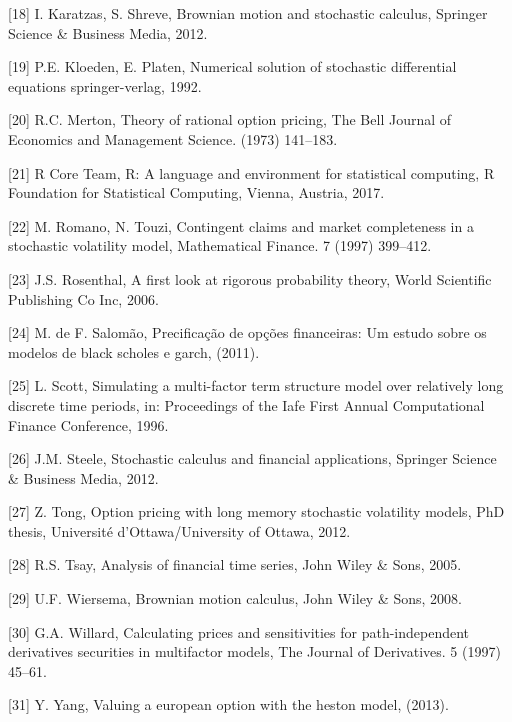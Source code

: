 \documentclass[12pt,twoside]{reedthesis}
\theoremstyle{definition}
\theoremstyle{definition}
\theoremstyle{remark}
\begin{document}
  \hypertarget{ref-karatzas2012brownian}{}
  {[}18{]} I. Karatzas, S. Shreve, Brownian motion and stochastic
  calculus, Springer Science \& Business Media, 2012.
  
  \hypertarget{ref-kloeden1992}{}
  {[}19{]} P.E. Kloeden, E. Platen, Numerical solution of stochastic
  differential equations springer-verlag, 1992.
  
  \hypertarget{ref-merton1973theory}{}
  {[}20{]} R.C. Merton, Theory of rational option pricing, The Bell
  Journal of Economics and Management Science. (1973) 141--183.
  
  \hypertarget{ref-rlang}{}
  {[}21{]} R Core Team, R: A language and environment for statistical
  computing, R Foundation for Statistical Computing, Vienna, Austria,
  2017.
  
  \hypertarget{ref-romano1997}{}
  {[}22{]} M. Romano, N. Touzi, Contingent claims and market completeness
  in a stochastic volatility model, Mathematical Finance. 7 (1997)
  399--412.
  
  \hypertarget{ref-rosenthal}{}
  {[}23{]} J.S. Rosenthal, A first look at rigorous probability theory,
  World Scientific Publishing Co Inc, 2006.
  
  \hypertarget{ref-salomao2011precificaccao}{}
  {[}24{]} M. de F. Salomão, Precificação de opções financeiras: Um estudo
  sobre os modelos de black scholes e garch, (2011).
  
  \hypertarget{ref-scott1996}{}
  {[}25{]} L. Scott, Simulating a multi-factor term structure model over
  relatively long discrete time periods, in: Proceedings of the Iafe First
  Annual Computational Finance Conference, 1996.
  
  \hypertarget{ref-steele2012stochastic}{}
  {[}26{]} J.M. Steele, Stochastic calculus and financial applications,
  Springer Science \& Business Media, 2012.
  
  \hypertarget{ref-tong2012option}{}
  {[}27{]} Z. Tong, Option pricing with long memory stochastic volatility
  models, PhD thesis, Université d'Ottawa/University of Ottawa, 2012.
  
  \hypertarget{ref-tsay2005analysis}{}
  {[}28{]} R.S. Tsay, Analysis of financial time series, John Wiley \&
  Sons, 2005.
  
  \hypertarget{ref-ubbo}{}
  {[}29{]} U.F. Wiersema, Brownian motion calculus, John Wiley \& Sons,
  2008.
  
  \hypertarget{ref-willard1997}{}
  {[}30{]} G.A. Willard, Calculating prices and sensitivities for
  path-independent derivatives securities in multifactor models, The
  Journal of Derivatives. 5 (1997) 45--61.
  
  \hypertarget{ref-yang2013valuing}{}
  {[}31{]} Y. Yang, Valuing a european option with the heston model,
  (2013).


\end{document}
